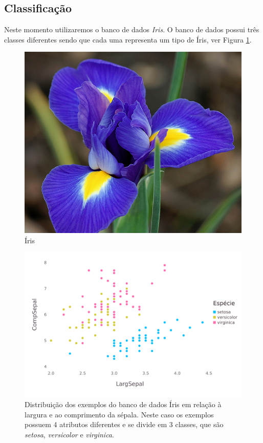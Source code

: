 \documentclass[
	12pt,				%
    oneside,			%
	a4paper,			%
	english,			%
	french,				%
	spanish,			%
	brazil,				%
	]{abntex2}
\begin{document}
        \subsection{Classificação}
            Neste momento utilizaremos o banco de dados \textit{Iris}. O banco de dados possui três classes diferentes sendo que cada uma representa um tipo de Íris, ver Figura \ref{fig:iris}.

            \begin{figure}[th]
                \centering
                \includegraphics{iris.jpg}
                \caption{Íris}
                \label{fig:iris}
            \end{figure}

            \begin{figure}[bht]
                \centering
                \includegraphics[width=0.8\columnwidth]{IrisPoint.png}
                \caption{Distribuição dos exemplos do banco de dados Íris em relação à largura e ao comprimento da sépala. Neste caso os exemplos possuem 4 atributos diferentes e se divide em 3 classes, que são \emph{setosa}, \emph{versicolor} e \emph{virginica}.}
                \label{fig:irispoint}
            \end{figure}
\end{document}

